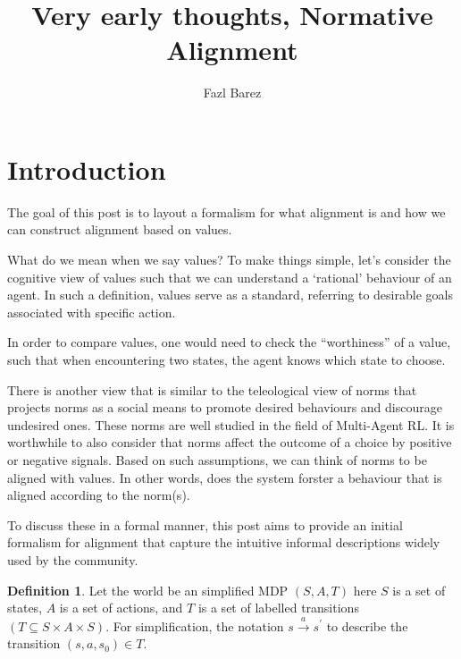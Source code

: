 \documentclass{article}
\title{Very early thoughts, Normative Alignment}
\author{Fazl Barez} %
\theoremstyle{definition}
\newtheorem{definition}{Definition}
\theoremstyle{remark}
\begin{document}
\maketitle



\section*{Introduction}


The goal of this post is to layout a formalism for what alignment is and how we can construct alignment based on values. 

What do we mean when we say values? To make things simple, let's consider the cognitive view of values such that we can understand a ‘rational’ behaviour of an agent. In such a definition, values serve as a standard, referring to desirable goals associated with specific action. 

In order to compare values, one would need to check the “worthiness” of a value, such that when encountering two states, the agent knows which state to choose. 

There is another view that is similar to the teleological view of norms that projects norms as a social means to promote desired behaviours and discourage undesired ones. These norms are well studied in the field of Multi-Agent RL. It is worthwhile to also consider that norms affect the outcome of a choice by positive or negative signals. Based on such assumptions, we can think of norms to be aligned with values. In other words, does the system forster a behaviour that is aligned according to the norm(s). 

To discuss these in a formal manner, this post aims to provide an initial formalism for alignment that capture the intuitive informal descriptions widely used by the community.  

\begin{definition}
Let the world be an simplified MDP $(S, A, T)$ here $S$ is a set of states, $A$ is a set of actions, and $T$ is a set of labelled transitions $(T \subseteq S \times A \times S)$. For simplification, the notation $s \xrightarrow{a} s^\prime$ to describe the transition $(s, a, s_0 ) \in T$.

\end{definition} 
\end{document}
